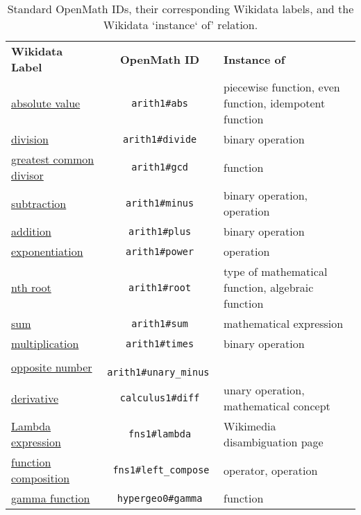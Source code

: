 \documentclass[a4paper]{article}
\begin{document}
\begin{table}[p]
\caption{Standard OpenMath IDs, their corresponding Wikidata labels, and the Wikidata `instance` of' relation.}
\vspace{2em}
\label{tb1}
\begin{tabular}{p{.23\linewidth}cp{.5\linewidth}}
\textbf{Wikidata Label} & \textbf{OpenMath ID} & \textbf{Instance of} \\
\href{https://www.wikidata.org/entity/Q120812}{absolute value} &\texttt{ arith1\#abs }& piecewise function, even function, idempotent function \\
\href{https://www.wikidata.org/entity/Q1226939}{division} &\texttt{ arith1\#divide }& binary operation \\
\href{https://www.wikidata.org/entity/Q131752}{greatest common divisor} &\texttt{ arith1\#gcd }& function \\
\href{https://www.wikidata.org/entity/Q40754}{subtraction} &\texttt{ arith1\#minus }& binary operation, operation \\
\href{https://www.wikidata.org/entity/Q32043}{addition} &\texttt{ arith1\#plus }& binary operation \\
\href{https://www.wikidata.org/entity/Q33456}{exponentiation} &\texttt{ arith1\#power }& operation \\
\href{https://www.wikidata.org/entity/Q601053}{nth root} &\texttt{ arith1\#root }& type of mathematical function, algebraic function \\
\href{https://www.wikidata.org/entity/Q218005}{sum} &\texttt{ arith1\#sum }& mathematical expression \\
\href{https://www.wikidata.org/entity/Q40276}{multiplication} &\texttt{ arith1\#times }& binary operation \\
\href{https://www.wikidata.org/entity/Q715358}{opposite number} &\texttt{ arith1\#unary\_minus }&  \\
\href{https://www.wikidata.org/entity/Q29175}{derivative} &\texttt{ calculus1\#diff }& unary operation, mathematical concept \\
\href{https://www.wikidata.org/entity/Q6481163}{Lambda expression} &\texttt{ fns1\#lambda }& Wikimedia disambiguation page \\
\href{https://www.wikidata.org/entity/Q244761}{function composition} &\texttt{ fns1\#left\_compose }& operator, operation \\
\href{https://www.wikidata.org/entity/Q190573}{gamma function} &\texttt{ hypergeo0\#gamma }& function \\

\end{tabular}
\end{table}
\end{document}
